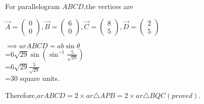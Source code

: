 \documentclass[12pt]{article}
\providecommand{\brak}[1]{\ensuremath{\left(#1\right)}}
\begin{document}
 
  For parallelogram $ABCD$,the vertices are

   $\Vec{A}=\begin{pmatrix}
       0\\0
   \end{pmatrix},
 \Vec{B}=\begin{pmatrix}
       6\\0
   \end{pmatrix},
   \Vec{C}=\begin{pmatrix}
       8\\5
   \end{pmatrix},
   \Vec{D}=\begin{pmatrix}
       2\\5
   \end{pmatrix}$
   
$\implies ar ABCD = ab\sin\theta$\\
 =$6\sqrt{29}\sin\brak{\sin^{-1}{\frac{5}{\sqrt{29}}}}$\\
=$6\sqrt{29}\frac{5}{\sqrt{29}}$\\
=30 square units.


 Therefore,$ar ABCD = 2\times ar\triangle APB = 2\times ar \triangle BQC$\brak{proved}.\\
 
\end{document}

